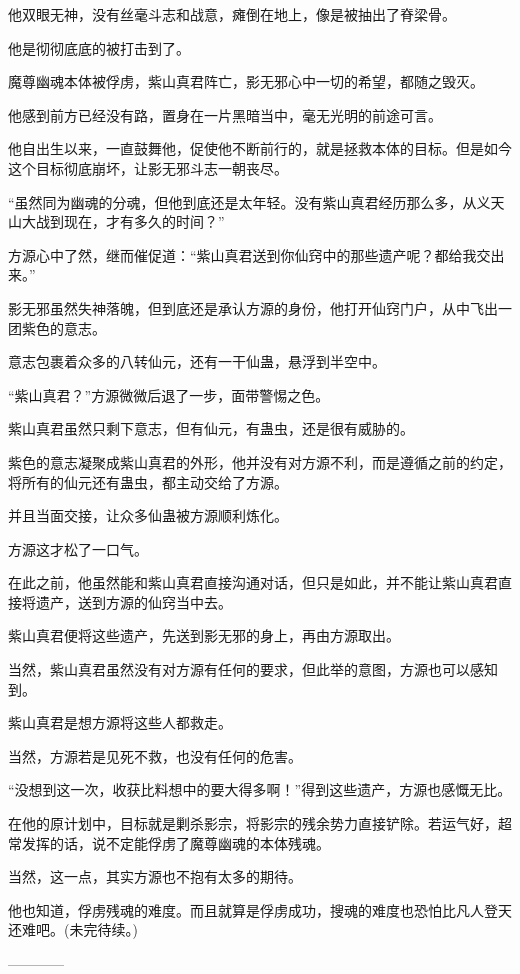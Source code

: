 \begin{this_body}
他双眼无神，没有丝毫斗志和战意，瘫倒在地上，像是被抽出了脊梁骨。

他是彻彻底底的被打击到了。

魔尊幽魂本体被俘虏，紫山真君阵亡，影无邪心中一切的希望，都随之毁灭。

他感到前方已经没有路，置身在一片黑暗当中，毫无光明的前途可言。

他自出生以来，一直鼓舞他，促使他不断前行的，就是拯救本体的目标。但是如今这个目标彻底崩坏，让影无邪斗志一朝丧尽。

“虽然同为幽魂的分魂，但他到底还是太年轻。没有紫山真君经历那么多，从义天山大战到现在，才有多久的时间？”

方源心中了然，继而催促道：“紫山真君送到你仙窍中的那些遗产呢？都给我交出来。”

影无邪虽然失神落魄，但到底还是承认方源的身份，他打开仙窍门户，从中飞出一团紫色的意志。

意志包裹着众多的八转仙元，还有一干仙蛊，悬浮到半空中。

“紫山真君？”方源微微后退了一步，面带警惕之色。

紫山真君虽然只剩下意志，但有仙元，有蛊虫，还是很有威胁的。

紫色的意志凝聚成紫山真君的外形，他并没有对方源不利，而是遵循之前的约定，将所有的仙元还有蛊虫，都主动交给了方源。

并且当面交接，让众多仙蛊被方源顺利炼化。

方源这才松了一口气。

在此之前，他虽然能和紫山真君直接沟通对话，但只是如此，并不能让紫山真君直接将遗产，送到方源的仙窍当中去。

紫山真君便将这些遗产，先送到影无邪的身上，再由方源取出。

当然，紫山真君虽然没有对方源有任何的要求，但此举的意图，方源也可以感知到。

紫山真君是想方源将这些人都救走。

当然，方源若是见死不救，也没有任何的危害。

“没想到这一次，收获比料想中的要大得多啊！”得到这些遗产，方源也感慨无比。

在他的原计划中，目标就是剿杀影宗，将影宗的残余势力直接铲除。若运气好，超常发挥的话，说不定能俘虏了魔尊幽魂的本体残魂。

当然，这一点，其实方源也不抱有太多的期待。

他也知道，俘虏残魂的难度。而且就算是俘虏成功，搜魂的难度也恐怕比凡人登天还难吧。(未完待续。)

------------

\end{this_body}

